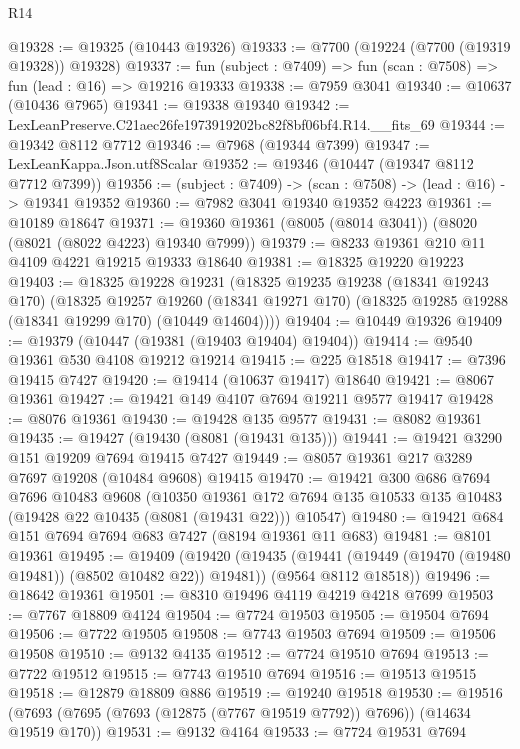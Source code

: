 \begin{lexlean}{R14}
\begin{coremodule}
@19328 := @19325 (@10443 @19326)
@19333 := @7700 (@19224 (@7700 (@19319 @19328)) @19328)
@19337 := fun (subject : @7409) => fun (scan : @7508) => fun (lead : @16) => @19216 @19333
@19338 := @7959 @3041
@19340 := @10637 (@10436 @7965)
@19341 := @19338 @19340
@19342 := LexLeanPreserve.C21aec26fe1973919202bc82f8bf06bf4.R14.__fits_69
@19344 := @19342 @8112 @7712
@19346 := @7968 (@19344 @7399)
@19347 := LexLeanKappa.Json.utf8Scalar
@19352 := @19346 (@10447 (@19347 @8112 @7712 @7399))
@19356 := (subject : @7409) -> (scan : @7508) -> (lead : @16) -> @19341 @19352
@19360 := @7982 @3041 @19340 @19352 @4223
@19361 := @10189 @18647
@19371 := @19360 @19361 (@8005 (@8014 @3041)) (@8020 (@8021 (@8022 @4223) @19340 @7999))
@19379 := @8233 @19361 @210 @11 @4109 @4221 @19215 @19333 @18640
@19381 := @18325 @19220 @19223
@19403 := @18325
    @19228
    @19231
    (@18325
      @19235
      @19238
      (@18341 @19243 @170)
      (@18325
        @19257
        @19260
        (@18341 @19271 @170)
        (@18325 @19285 @19288 (@18341 @19299 @170) (@10449 @14604))))
@19404 := @10449 @19326
@19409 := @19379 (@10447 (@19381 (@19403 @19404) @19404))
@19414 := @9540 @19361 @530 @4108 @19212 @19214
@19415 := @225 @18518
@19417 := @7396 @19415 @7427
@19420 := @19414 (@10637 @19417) @18640
@19421 := @8067 @19361
@19427 := @19421 @149 @4107 @7694 @19211 @9577 @19417
@19428 := @8076 @19361
@19430 := @19428 @135 @9577
@19431 := @8082 @19361
@19435 := @19427 (@19430 (@8081 (@19431 @135)))
@19441 := @19421 @3290 @151 @19209 @7694 @19415 @7427
@19449 := @8057 @19361 @217 @3289 @7697 @19208 (@10484 @9608) @19415
@19470 := @19421
    @300
    @686
    @7694
    @7696
    @10483
    @9608
    (@10350
      @19361
      @172
      @7694
      @135
      @10533
      @135
      @10483
      (@19428 @22 @10435 (@8081 (@19431 @22)))
      @10547)
@19480 := @19421 @684 @151 @7694 @7694 @683 @7427 (@8194 @19361 @11 @683)
@19481 := @8101 @19361
@19495 := @19409
    (@19420
      (@19435 (@19441 (@19449 (@19470 (@19480 @19481)) (@8502 @10482 @22)) @19481))
      (@9564 @8112 @18518))
@19496 := @18642 @19361
@19501 := @8310 @19496 @4119 @4219 @4218 @7699
@19503 := @7767 @18809 @4124
@19504 := @7724 @19503
@19505 := @19504 @7694
@19506 := @7722 @19505
@19508 := @7743 @19503 @7694
@19509 := @19506 @19508
@19510 := @9132 @4135
@19512 := @7724 @19510 @7694
@19513 := @7722 @19512
@19515 := @7743 @19510 @7694
@19516 := @19513 @19515
@19518 := @12879 @18809 @886
@19519 := @19240 @19518
@19530 := @19516 (@7693 (@7695 (@7693 (@12875 (@7767 @19519 @7792)) @7696)) (@14634 @19519 @170))
@19531 := @9132 @4164
@19533 := @7724 @19531 @7694

\end{coremodule}
\end{lexlean}
